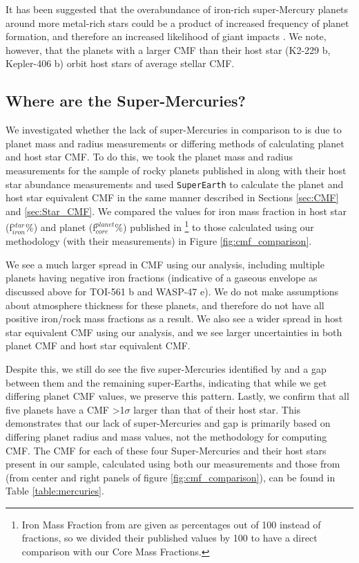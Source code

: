 \documentclass[twocolumn]{aastex631}
\begin{document}
It has been suggested that the overabundance of iron-rich super-Mercury planets around more metal-rich stars could be a product of increased frequency of planet formation, and therefore an increased likelihood of giant impacts \citep{Adibekyan2021}. We note, however, that the planets with a larger CMF than their host star (K2-229 b, Kepler-406 b) orbit host stars of average stellar CMF. 

\subsection{Where are the Super-Mercuries?}

We investigated whether the lack of super-Mercuries in comparison to \cite{Adibekyan2021} is due to planet mass and radius measurements or differing methods of calculating planet and host star CMF. To do this, we took the planet mass and radius measurements for the sample of rocky planets published in \cite{Adibekyan2021} along with their host star abundance measurements and used \texttt{SuperEarth} to calculate the planet and host star equivalent CMF in the same manner described in Sections \ref{sec:CMF} and \ref{sec:Star_CMF}. We compared the values for iron mass fraction in host star (f$^{star}_{iron}\%$) and planet (f$^{planet}_{core}\%$) published in \cite{Adibekyan2021}\footnote{Iron Mass Fraction from \cite{Adibekyan2021} are given as percentages out of 100 instead of fractions, so we divided their published values by 100 to have a direct comparison with our Core Mass Fractions.} to those calculated using our methodology (with their measurements) in Figure \ref{fig:cmf_comparison}. 

We see a much larger spread in CMF using our analysis, including multiple planets having negative iron fractions (indicative of a gaseous envelope as discussed above for TOI-561 b and WASP-47 e). We do not make assumptions about atmosphere thickness for these planets, and therefore do not have all positive iron/rock mass fractions as a result. We also see a wider spread in host star equivalent CMF using our analysis, and we see larger uncertainties in both planet CMF and host star equivalent CMF. 

Despite this, we still do see the five super-Mercuries identified by \citep{Adibekyan2021} and a gap between them and the remaining super-Earths, indicating that while we get differing planet CMF values, we preserve this pattern. Lastly, we confirm that all five planets have a CMF >1$\sigma$ larger than that of their host star. This demonstrates that our lack of super-Mercuries and gap is primarily based on differing planet radius and mass values, not the methodology for computing CMF. The CMF for each of these four Super-Mercuries and their host stars present in our sample, calculated using both our measurements and those from \cite{Adibekyan2021} (from center and right panels of figure \ref{fig:cmf_comparison}), can be found in Table \ref{table:mercuries}. 
\end{document}
